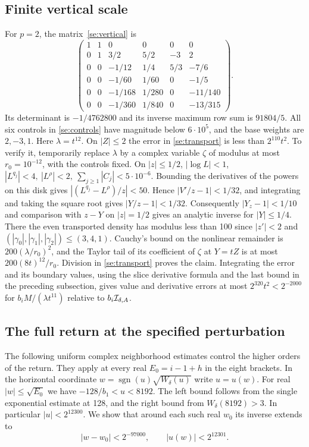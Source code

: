 \subsection{Finite vertical scale}
For \(p=2\), the matrix~\eqref{se:vertical} is
\[
\begin{pmatrix}
 1&1&0&0&0&0\\
 0&1&3/2&5/2&-3&2\\
 0&0&-1/12&1/4&5/3&-7/6\\
 0&0&-1/60&1/60&0&-1/5\\
 0&0&-1/168&1/280&0&-11/140\\
 0&0&-1/360&1/840&0&-13/315
\end{pmatrix}.
\]
Its determinant is \(-1/4762800\) and its inverse maximum row sum is
\(91804/5\).
All six controls in \eqref{se:controls} have magnitude below \(6\cdot10^5\),
and the base weights are \(2,-3,1\). Here \(\lambda=t^{12}\).
On \(|Z|\le2\) the error in \eqref{se:transport} is less than
\(2^{110}t^2\). To verify it, temporarily replace \(\lambda\) by a
complex variable \(\zeta\) of modulus at most \(r_0=10^{-12}\), with
the controls fixed. On \(|z|\le1/2\), \(|\log L|<1\),
\(|L^{q_j}|<4,\ |L^\rho|<2,\ \sum_{j\ge1}|C_j|<5\cdot10^{-6}\).
Bounding the derivatives of the powers on this disk gives
\(|(L^{q_j}-L^\rho)/z|<50\). Hence \(|V'/z-1|<1/32\), and integrating
and taking the square root gives \(|Y/z-1|<1/32\).
Consequently \(|Y_z-1|<1/10\) and comparison with \(z-Y\) on
\(|z|=1/2\) gives an analytic inverse for \(|Y|\le1/4\).
There the even transported density has modulus less than 100 since
\(|z'|<2\) and \((|\gamma_0|,|\gamma_1|,|\gamma_2|)\le(3,4,1)\).
Cauchy's bound on the nonlinear remainder is \(200(\lambda/r_0)^2\),
and the Taylor tail of its coefficient of \(\zeta\) at \(Y=tZ\) is at
most \(200(8t)^{12}/r_0\). Division in \eqref{se:transport} proves the
claim. Integrating the error and its boundary values, using the slice
derivative formula and the last bound in the preceding subsection,
gives value and derivative errors at most \(2^{320}t^2<2^{-2000}\)
for \(b_i M/(\lambda t^{11})\) relative to \(b_i{\cal I}_{\delta,A}\).

\subsection{The full return at the specified perturbation}
The following uniform complex neighborhood estimates control the
higher orders of the return. They apply at every real \(E_0=i-1+h\)
in the eight brackets. In the horizontal coordinate
\(w=\operatorname{sgn}(u)\sqrt{W_\delta(u)}\) write \(u=u(w)\).
For real \(|w|\le\sqrt{E_0}\) we have
\(-128/b_1<u<8192\). The left bound follows from the single exponential estimate at 128, and the right bound from
\(W_\delta(8192)>3\). In particular \(|u|<2^{12300}\).
We show that around each such real \(w_0\) its inverse extends to
\begin{equation}
          |w-w_0|<2^{-97000},\qquad |u(w)|<2^{12301}.               \label{six:inverse}
\end{equation}

